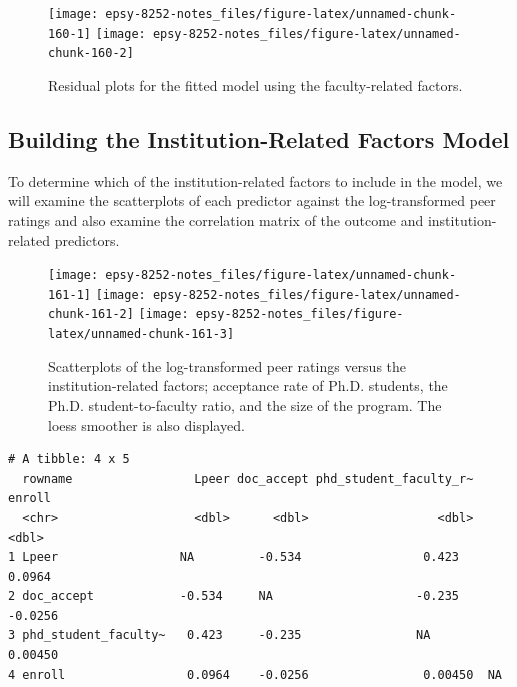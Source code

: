 \documentclass[]{book}
\newenvironment{Shaded}{\begin{snugshade}}{\end{snugshade}}
\newcommand{\KeywordTok}[1]{\textcolor[rgb]{0.13,0.29,0.53}{\textbf{#1}}}
\newcommand{\NormalTok}[1]{#1}
\newcommand{\OperatorTok}[1]{\textcolor[rgb]{0.81,0.36,0.00}{\textbf{#1}}}
\newcommand{\StringTok}[1]{\textcolor[rgb]{0.31,0.60,0.02}{#1}}
\begin{document}
\begin{figure}

{\centering \texttt{[image: epsy-8252-notes\_files/figure-latex/unnamed-chunk-160-1]} \texttt{[image: epsy-8252-notes\_files/figure-latex/unnamed-chunk-160-2]} 

}

\caption{Residual plots for the fitted model using the faculty-related factors.}\label{fig:unnamed-chunk-160}
\end{figure}

\hypertarget{building-the-institution-related-factors-model}{%
\subsection{Building the Institution-Related Factors Model}\label{building-the-institution-related-factors-model}}

To determine which of the institution-related factors to include in the model, we will examine the scatterplots of each predictor against the log-transformed peer ratings and also examine the correlation matrix of the outcome and institution-related predictors.

\begin{figure}

{\centering \texttt{[image: epsy-8252-notes\_files/figure-latex/unnamed-chunk-161-1]} \texttt{[image: epsy-8252-notes\_files/figure-latex/unnamed-chunk-161-2]} \texttt{[image: epsy-8252-notes\_files/figure-latex/unnamed-chunk-161-3]} 

}

\caption{Scatterplots of the log-transformed peer ratings versus the institution-related factors; acceptance rate of Ph.D. students, the Ph.D. student-to-faculty ratio, and the size of the program. The loess smoother is also displayed.}\label{fig:unnamed-chunk-161}
\end{figure}

\begin{Shaded}
\end{Shaded}

\begin{verbatim}
# A tibble: 4 x 5
  rowname                 Lpeer doc_accept phd_student_faculty_r~    enroll
  <chr>                   <dbl>      <dbl>                  <dbl>     <dbl>
1 Lpeer                 NA         -0.534                 0.423     0.0964 
2 doc_accept            -0.534     NA                    -0.235    -0.0256 
3 phd_student_faculty~   0.423     -0.235                NA         0.00450
4 enroll                 0.0964    -0.0256                0.00450  NA      
\end{verbatim}
\end{document}
